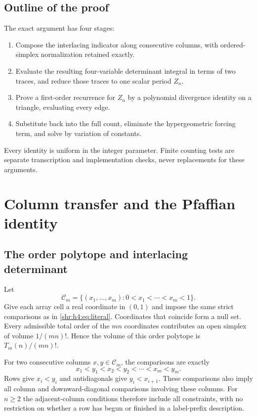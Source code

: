 \documentclass[11pt,letterpaper]{article}
\numberwithin{equation}{section}
\theoremstyle{definition}
\newcommand{\1}{\mathbf 1}
\begin{document}
\subsection{Outline of the proof}
The exact argument has four stages:
\begin{enumerate}
\item Compose the interlacing indicator along consecutive columns, with
      ordered-simplex normalization retained exactly.
\item Evaluate the resulting four-variable determinant integral in terms
      of two traces, and reduce those traces to one scalar period $Z_n$.
\item Prove a first-order recurrence for $Z_n$ by a polynomial divergence
      identity on a triangle, evaluating every edge.
\item Substitute back into the full count, eliminate the hypergeometric
      forcing term, and solve by variation of constants.
\end{enumerate}
Every identity is uniform in the integer parameter. Finite counting tests
are separate transcription and implementation checks, never replacements
for these arguments.

\section{Column transfer and the Pfaffian identity}
\label{shr:h4:sec:transfer}
\subsection{The order polytope and interlacing determinant}
Let
\[
 \mathcal C_m=\{(x_1,\ldots,x_m):0<x_1<\cdots<x_m<1\}.
\]
Give each array cell a real coordinate in $(0,1)$ and impose the same
strict comparisons as in \eqref{shr:h4:eq:literal}. Coordinates that coincide
form a null set. Every admissible total order of the $mn$ coordinates
contributes an open simplex of volume $1/(mn)!$. Hence the volume of this
order polytope is $T_m(n)/(mn)!$.

For two consecutive columns $x,y\in\mathcal C_m$, the comparisons are
exactly
\begin{equation}
 x_1<y_1<x_2<y_2<\cdots<x_m<y_m.
 \label{shr:h4:eq:interlace}
\end{equation}
Rows give $x_i<y_i$ and antidiagonals give $y_i<x_{i+1}$. These comparisons
also imply all column and downward-diagonal comparisons involving these
columns. For $n\ge2$ the adjacent-column conditions therefore include all
constraints, with no restriction on whether a row has begun or finished
in a label-prefix description.
\end{document}
